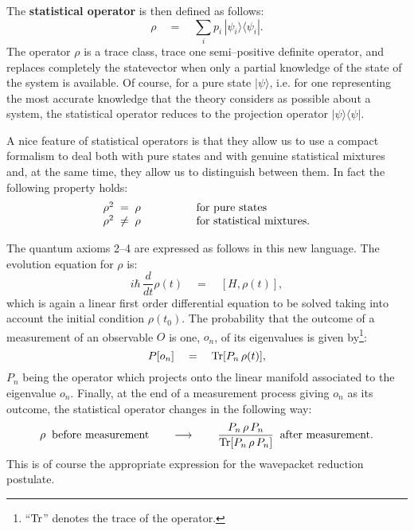 \documentclass[10pt,a4paper]{article}
\begin{document}
The {\bf statistical operator} is then defined as follows:
\begin{equation}
\rho \quad = \quad \sum_{i} p_{i}\, |\psi_{i}\rangle
\langle\psi_{i}|.
\end{equation}
The operator $\rho$ is a trace class, trace one semi--positive
definite operator, and replaces completely the statevector when
only a partial knowledge of the state of the system is available.
Of course, for a pure state $|\psi\rangle$, i.e. for one
representing the most accurate knowledge that the theory considers
as possible about a system, the statistical operator reduces to
the projection operator $|\psi\rangle\langle\psi|$.

A nice feature of statistical operators is that they allow us to
use a compact formalism to deal both with pure states and with
genuine statistical mixtures and, at the same time, they allow us
to distinguish between them. In fact the following property holds:
\[
\begin{array}{ll}
\rho^{2} \; = \; \rho \qquad & \qquad \makebox{for pure states} \\
\rho^{2} \; \neq \; \rho \qquad & \qquad \makebox{for statistical
mixtures.}
\end{array}
\]

The quantum axioms 2--4 are expressed  as follows in this new
language. The evolution equation for $\rho$ is:
\begin{equation}
i\hbar\,\frac{d}{dt} \rho(t) \quad = \quad \left[ H, \rho(t)
\right],
\end{equation}
which is again a linear first order differential equation to be
solved taking into account the initial condition $\rho(t_{0})$.
The probability that the outcome of a measurement of an observable
$O$ is one, $o_{n}$, of its eigenvalues is given
by\footnote{``$\makebox{Tr}$'' denotes the trace of the
operator.}:
\begin{equation}
P[o_{n}] \quad = \quad \makebox{Tr}[P_{n}\,\rho(t)],
\end{equation}
$P_{n}$ being the operator which projects onto the linear manifold
associated to the eigenvalue $o_{n}$. Finally, at the end of a
measurement process giving $o_{n}$ as its outcome, the statistical
operator changes in the following way:
\[
\rho \;\;\makebox{before measurement} \qquad \longrightarrow
\qquad \frac{P_{n}\,\rho\,P_{n}}{\makebox{Tr}[P_{n}\,\rho\,P_{n}]}
\;\;\makebox{after measurement}.
\]
This is of course the appropriate expression for the wavepacket
reduction postulate.
\end{document}
